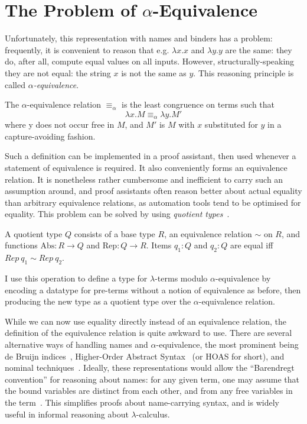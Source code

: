 \section{The Problem of \(\alpha\)-Equivalence}
\label{sec:alpha-equivalence}
Unfortunately, this representation with names and binders has a problem: frequently, it is convenient to reason that e.g. \(\lambda x.x\) and \(\lambda y.y\) are the same: they do, after all, compute equal values on all inputs.
However, structurally-speaking they are not equal: the string \(x\) is not the same as \(y\).
This reasoning principle is called \emph{\(\alpha\)-equivalence}.

\begin{definition}
The \(\alpha\)-equivalence relation \(\equiv_\alpha\) is the least congruence on terms such that
\[
\lambda x.M \equiv_\alpha \lambda y.M'
\]
where y does not occur free in \(M\), and \(M'\) is \(M\) with \(x\) substituted for \(y\) in a capture-avoiding fashion.
\end{definition}

Such a definition can be implemented in a proof assistant, then used whenever a statement of equivalence is required.
It also conveniently forms an equivalence relation.
It is nonetheless rather cumbersome and inefficient to carry such an assumption around, and proof assistants often reason better about actual equality than arbitrary equivalence relations, as automation tools tend to be optimised for equality.
This problem can be solved by using \emph{quotient types}~\cite{quotient}.

\begin{definition}
A quotient type \(Q\) consists of a base type \(R\), an equivalence relation \(\sim\) on \(R\), and functions \(\mathrm{Abs} : R \to Q\) and \(\mathrm{Rep} : Q \to R\).
Items \(q_1 : Q\) and \(q_2 : Q\) are equal iff \(Rep\ q_1 \sim Rep\ q_2\).
\end{definition}

I use this operation to define a type for \(\lambda\)-terms modulo \(\alpha\)-equivalence by encoding a datatype for pre-terms without a notion of equivalence as before, then producing the new type as a quotient type over the \(\alpha\)-equivalence relation.

While we can now use equality directly instead of an equivalence relation, the definition of the equivalence relation is quite awkward to use.
There are several alternative ways of handling names and \(\alpha\)-equivalence, the most prominent being de Bruijn indices~\cite{deBruijn}, Higher-Order Abstract Syntax~\cite{HOAS} (or HOAS for short), and nominal techniques~\cite{nominal}.
Ideally, these representations would allow the ``Barendregt convention'' for reasoning about names: for any given term, one may assume that the bound variables are distinct from each other, and from any free variables in the term~\cite{lambda-overview}.
This simplifies proofs about name-carrying syntax, and is widely useful in informal reasoning about \(\lambda\)-calculus.

